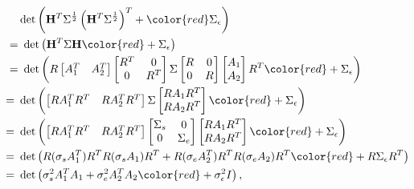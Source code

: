 \documentclass[12pt]{article}
\begin{document}
\begin{align*}
    \quad&\det \left( \mathbf{H}^{T}\Sigma^{\frac{1}{2}}\left( \mathbf{H}^{T}\Sigma^{\frac{1}{2}} \right)^{T} + {\color{red}\Sigma_\epsilon}\right)\\
    =&\,\,\det \left( \mathbf{H}^{T}\Sigma \mathbf{H} {\color{red}+\Sigma_\epsilon}\right) \\
    =&\,\,\det\left(
    R
    \begin{bmatrix}
    A_{1}^{T}&
    A_{2}^{T}
    \end{bmatrix}
    \begin{bmatrix}
    R^{T}&0 \\
    0&R^{T}
    \end{bmatrix}
    \Sigma
    \begin{bmatrix}
    R&0 \\
    0&R
    \end{bmatrix}
    \begin{bmatrix}
    A_{1} \\
    A_{2}
    \end{bmatrix}
    R^{T}{\color{red}+\Sigma_\epsilon}
    \right)\\
    =\,\,&\det \left( 
    \begin{bmatrix}
    RA_{1}^{T}R^{T}&
    RA_{2}^{T}R^{T}
    \end{bmatrix}
    \Sigma
    \begin{bmatrix}
    RA_{1}R^{T}\\ 
    RA_{2}R^{T}
    \end{bmatrix}{\color{red}+\Sigma_\epsilon}
    \right) \\
    =\,\,&\det \left( 
    \begin{bmatrix}
    RA_{1}^{T}R^{T}&
    RA_{2}^{T}R^{T}
    \end{bmatrix}
    \begin{bmatrix}
    \Sigma_{s}&0 \\
    0&\Sigma_{e}
    \end{bmatrix}
    \begin{bmatrix}
    RA_{1}R^{T}\\ 
    RA_{2}R^{T}
    \end{bmatrix}{\color{red}+\Sigma_\epsilon}
    \right)\\
    =\,\,&\det \left( 
    R(\sigma_{s}A_{1}^{T})R^{T}R(\sigma_{s}A_{1})R^{T}+R(\sigma_{e}A_{2}^{T})R^{T}R(\sigma_{e}A_{2})R^{T}{\color{red}+R\Sigma_\epsilon R^T}
    \right) \\
    =\,\,&\det\left( 
    \sigma_{s}^2A_{1}^{T}A_{1}+\sigma_{e}^2A_{2}^{T}A_{2}{\color{red}+\sigma_\epsilon^2 I}
    \right),
\end{align*}
\end{document}
